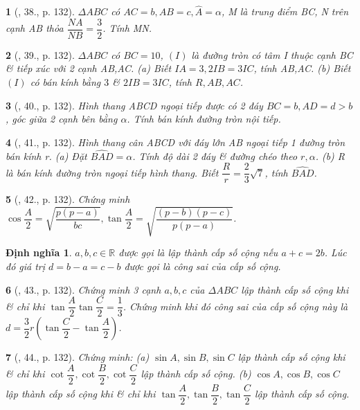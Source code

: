 \documentclass{article}
\newtheorem{baitoan}{}
\newtheorem{dinhnghia}{Định nghĩa}
\begin{document}
\begin{baitoan}[\cite{TLCT_hinh_hoc_10}, 38., p. 132]
	$\Delta ABC$ có $AC = b,AB = c,\widehat{A} = \alpha$, M là trung điểm BC, N trên cạnh AB thỏa $\dfrac{NA}{NB} = \dfrac{3}{2}$. Tính MN.
\end{baitoan}

\begin{baitoan}[\cite{TLCT_hinh_hoc_10}, 39., p. 132]
	$\Delta ABC$ có $BC = 10$, $(I)$ là đường tròn có tâm I thuộc cạnh BC \& tiếp xúc với 2 cạnh AB,AC. (a) Biết $IA = 3,2IB = 3IC$, tính AB,AC. (b) Biết $(I)$ có bán kính bằng $3$ \& $2IB = 3IC$, tính $R,AB,AC$.
\end{baitoan}

\begin{baitoan}[\cite{TLCT_hinh_hoc_10}, 40., p. 132]
	Hình thang ABCD ngoại tiếp được có 2 đáy $BC = b,AD = d > b$, góc giữa 2 cạnh bên bằng $\alpha$. Tính bán kính đường tròn nội tiếp.
\end{baitoan}

\begin{baitoan}[\cite{TLCT_hinh_hoc_10}, 41., p. 132]
	Hình thang cân ABCD với đáy lớn AB ngoại tiếp 1 đường tròn bán kính r. (a) Đặt $\widehat{BAD} = \alpha$. Tính độ dài 2 đáy \& đường chéo theo $r,\alpha$. (b) R là bán kính đường tròn ngoại tiếp hình thang. Biết $\dfrac{R}{r} = \dfrac{2}{3}\sqrt{7}$, tính $\widehat{BAD}$.
\end{baitoan}

\begin{baitoan}[\cite{TLCT_hinh_hoc_10}, 42., p. 132]
	Chứng minh $\cos\dfrac{A}{2} = \sqrt{\dfrac{p(p - a)}{bc}},\tan\dfrac{A}{2} = \sqrt{\dfrac{(p - b)(p - c)}{p(p - a)}}$.
\end{baitoan}

\begin{dinhnghia}
	$a,b,c\in\mathbb{R}$ được gọi là lập thành {\rm cấp số cộng} nếu $a + c = 2b$. Lúc đó giá trị $d = b - a = c - b$ được gọi là {\rm công sai} của cấp số cộng.
\end{dinhnghia}

\begin{baitoan}[\cite{TLCT_hinh_hoc_10}, 43., p. 132]
	Chứng minh 3 cạnh $a,b,c$ của $\Delta ABC$ lập thành cấp số cộng khi \& chỉ khi $\tan\dfrac{A}{2}\tan\dfrac{C}{2} = \dfrac{1}{3}$. Chứng minh khi đó công sai của cấp số cộng này là $d = \dfrac{3}{2}r\left(\tan\dfrac{C}{2} - \tan\dfrac{A}{2}\right)$.
\end{baitoan}

\begin{baitoan}[\cite{TLCT_hinh_hoc_10}, 44., p. 132]
	Chứng minh: (a) $\sin A,\sin B,\sin C$ lập thành cấp số cộng khi \& chỉ khi $\cot\dfrac{A}{2},\cot\dfrac{B}{2},\cot\dfrac{C}{2}$ lập thành cấp số cộng. (b) $\cos A,\cos B,\cos C$ lập thành cấp số cộng khi \& chỉ khi $\tan\dfrac{A}{2},\tan\dfrac{B}{2},\tan\dfrac{C}{2}$ lập thành cấp số cộng.
\end{baitoan}
\end{document}
